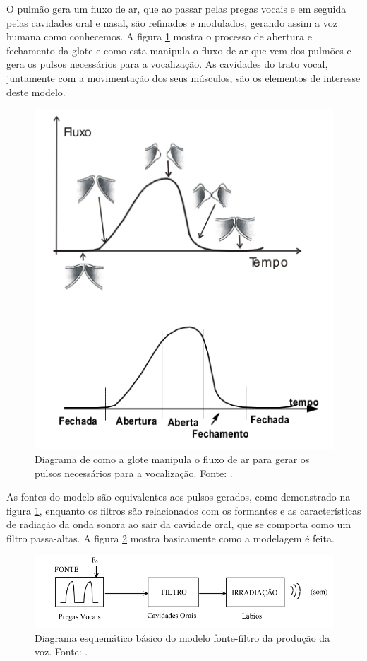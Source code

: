 \documentclass[
  12pt,       
  openright,      
  twoside,      
  a4paper,      
  english,      
  french,       
  spanish,      
  brazil,     
  ]{abntex2}
\begin{document}
O pulmão gera um fluxo de ar, que ao passar pelas pregas vocais e em seguida pelas cavidades oral e nasal, são refinados e modulados, gerando assim a voz humana como conhecemos. A figura \ref{fig:geracaoPulsosGloticos} mostra o processo de abertura e fechamento da glote e como esta manipula o fluxo de ar que vem dos pulmões e gera os pulsos necessários para a vocalização. As cavidades do trato vocal, juntamente com a movimentação dos seus músculos, são os elementos de interesse deste modelo.

\begin{figure}
\centering
\includegraphics[scale=0.7]{imagens/geracao_pulso_glotico.PNG}
\caption{Diagrama de como a glote manipula o fluxo de ar para gerar os pulsos necessários para a vocalização. Fonte: .}
\label{fig:geracaoPulsosGloticos}
\centering
\end{figure}

As fontes do modelo são equivalentes aos pulsos gerados, como demonstrado na figura \ref{fig:geracaoPulsosGloticos}, enquanto os filtros são relacionados com os formantes e as características de radiação da onda sonora ao sair da cavidade oral, que se comporta como um filtro passa-altas. A figura \ref{fig:modeloFonteFiltro} mostra basicamente como a modelagem é feita.

\begin{figure}
\includegraphics[width=\textwidth,keepaspectratio]{imagens/modelo_fonte_filtro.PNG}
\caption{Diagrama esquemático básico do modelo fonte-filtro da produção da voz. Fonte: .}
\label{fig:modeloFonteFiltro}
\end{figure}
\end{document}
